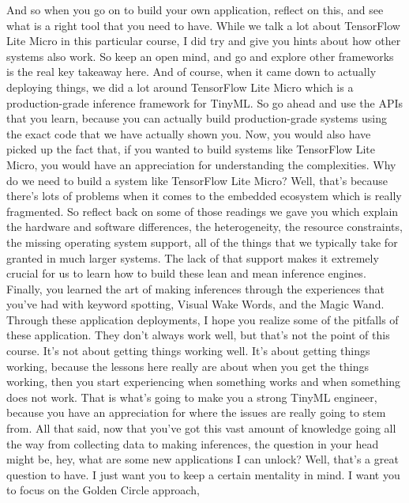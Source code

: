     And so when you go on to build your own application, reflect on this,
    and see what is a right tool that you need to have.
    While we talk a lot about TensorFlow Lite Micro in this particular course,
    I did try and give you hints about how other systems also work.
    So keep an open mind, and go and explore other frameworks
    is the real key takeaway here.
    And of course, when it came down to actually deploying things,
    we did a lot around TensorFlow Lite Micro
    which is a production-grade inference framework for TinyML.
    So go ahead and use the APIs that you learn,
    because you can actually build production-grade systems using
    the exact code that we have actually shown you.
    Now, you would also have picked up the fact
    that, if you wanted to build systems like TensorFlow Lite Micro,
    you would have an appreciation for understanding the complexities.
    Why do we need to build a system like TensorFlow Lite Micro?
    Well, that's because there's lots of problems
    when it comes to the embedded ecosystem which is really fragmented.
    So reflect back on some of those readings we gave you
    which explain the hardware and software differences,
    the heterogeneity, the resource constraints, the missing operating
    system support, all of the things that we typically take
    for granted in much larger systems.
    The lack of that support makes it extremely crucial
    for us to learn how to build these lean and mean inference engines.
    Finally, you learned the art of making inferences through the experiences
    that you've had with keyword spotting, Visual Wake Words, and the Magic Wand.
    Through these application deployments, I hope
    you realize some of the pitfalls of these application.
    They don't always work well, but that's not the point of this course.
    It's not about getting things working well.
    It's about getting things working, because the lessons here really
    are about when you get the things working,
    then you start experiencing when something works
    and when something does not work.
    That is what's going to make you a strong TinyML engineer, because you
    have an appreciation for where the issues are really going to stem from.
    All that said, now that you've got this vast amount of knowledge going
    all the way from collecting data to making inferences,
    the question in your head might be, hey, what
    are some new applications I can unlock?
    Well, that's a great question to have.
    I just want you to keep a certain mentality in mind.
    I want you to focus on the Golden Circle approach,
